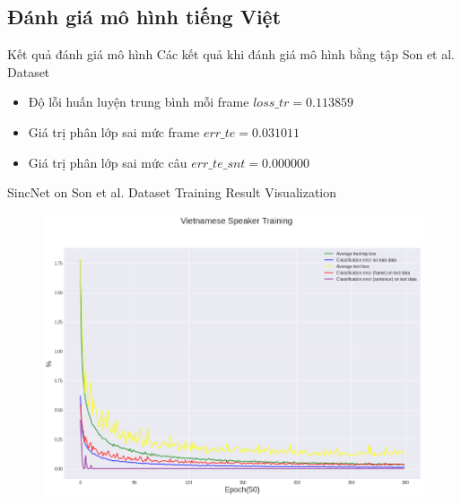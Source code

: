 \documentclass[notheorems, aspectratio=54]{beamer}
\begin{document}
\subsection{Đánh giá mô hình \textbf{tiếng Việt}}
\begin{frame}{Kết quả đánh giá mô hình}
	Các kết quả khi đánh giá mô hình bằng tập Son et al. Dataset
	\begin{itemize}
		\item Độ lỗi huấn luyện trung bình mỗi frame $loss\_tr=0.113859$
		\item Giá trị phân lớp sai mức frame $err\_te=0.031011$
		\item Giá trị phân lớp sai mức câu $err\_te\_snt =0.000000$
	\end{itemize}
\end{frame}
\begin{frame}{SincNet on Son et al. Dataset Training Result Visualization}
	\begin{figure}[H]
		\includegraphics[width=0.8\linewidth]{result/sincnet_vietnamese_plot.png}
		\label{fig:writing-thesis}
	\end{figure}
\end{frame}
\end{document}
